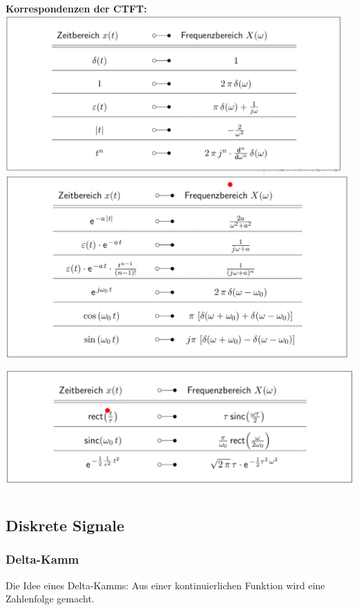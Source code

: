 \documentclass[12pt,a4paper]{scrartcl}
\begin{document}
  \noindent \textbf{Korrespondenzen der CTFT:} \\
  \includegraphics[height = 6cm]{Pictures/Korrespondenz.png}\\
  \includegraphics[height = 7cm]{Pictures/Korrespondenz2.png}\\
  \includegraphics[height = 5cm]{Pictures/Korrespondenz3.png}

  \newpage
  \subsection{Diskrete Signale}
  \label{sec:sub:diskrete-signale}

  \subsubsection{Delta-Kamm}
  \label{sec.sub:sub:delta-kamm}
  \noindent Die Idee eines Delta-Kamms: Aus einer kontinuierlichen Funktion wird eine Zahlenfolge gemacht. \\
  
\end{document}
